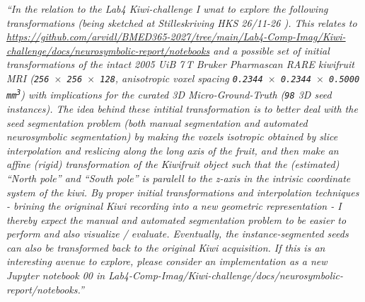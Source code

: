 \documentclass[10pt,a4paper]{article}
\renewcommand{\_}{\origunderscore\allowbreak}
\begin{document}
\begin{tcolorbox}
\begin{minipage}[t]{0.63\linewidth}
{    \textit{``In the relation to the Lab4 Kiwi-challenge I wnat to explore the following transformations (being sketched at Stilleskriving HKS 26/11-26 ). This relates to \url{https://github.com/arvidl/BMED365-2027/tree/main/Lab4-Comp-Imag/Kiwi-challenge/docs/neurosymbolic-report/notebooks} and a possible set of initial transformations of the intact 2005 UiB 7\,T Bruker Pharmascan RARE kiwifruit MRI (\texttt{256 $\times$ 256 $\times$ 128}, anisotropic voxel spacing \texttt{0.2344 $\times$ 0.2344 $\times$ 0.5000 mm\textsuperscript{3}}) with implications for the curated 3D Micro-Ground-Truth (\texttt{98} 3D seed instances). The idea behind these intitial transformation is to better deal with the seed segmentation problem (both manual segmentation and automated neurosymbolic segmentation) by making the voxels isotropic obtained by slice interpolation and reslicing along the long axis of the fruit, and then make an affine (rigid) transformation of the Kiwifruit object such that the (estimated) ``North pole'' and ``South pole'' is paralell to the z-axis in the intrisic coordinate system of the kiwi. By proper initial transformations and interpolation techniques - brining the origninal Kiwi recording into a new geometric representation - I thereby expect the manual and automated segmentation problem to be easier to perform and also visualize / evaluate. Eventually, the instance-segmented seeds can also be transformed back to the original Kiwi acquisition. If this is an interesting avenue to explore, please consider an implementation as a new Jupyter notebook 00 in Lab4-Comp-Imag/Kiwi-challenge/docs/neurosymbolic-report/notebooks.''}\par}
\end{minipage}
\end{tcolorbox}
\end{document}
